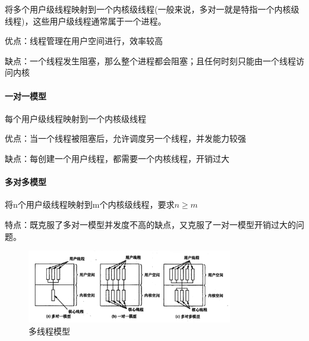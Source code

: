     将多个用户级线程映射到一个内核级线程(一般来说，多对一就是特指一个内核级线程)，这些用户级线程通常属于一个进程。

    优点：线程管理在用户空间进行，效率较高

    缺点：一个线程发生阻塞，那么整个进程都会阻塞；且任何时刻只能由一个线程访问内核

\paragraph{一对一模型}

    每个用户级线程映射到一个内核级线程

    优点：当一个线程被阻塞后，允许调度另一个线程，并发能力较强

    缺点：每创建一个用户线程，都需要一个内核线程，开销过大

\paragraph{多对多模型}

    将n个用户级线程映射到m个内核级线程，要求$n \geq m$

    特点：既克服了多对一模型并发度不高的缺点，又克服了一对一模型开销过大的问题。

\begin{figure}[!htbp]
    \centering
    \includegraphics[width=0.8\textwidth]{image/chapter02/多线程模型.png}
    \caption{多线程模型}
\end{figure}

